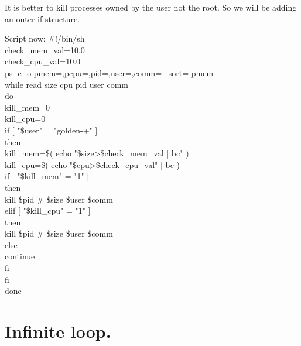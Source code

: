\documentclass[12pt,a4paper]{article}
\begin{document}
It is better to kill processes owned by the user not the root. So we will be adding an outer if structure.\\
\begin{flushleft}
Script now:
\newline
\#!/bin/sh\\
check\_mem\_val=10.0\\
check\_cpu\_val=10.0\\
ps -e -o pmem=,pcpu=,pid=,user=,comm= --sort=-pmem |\\
  while read size cpu pid user comm\\
  do\\
kill\_mem=0\\
kill\_cpu=0\\
if [ "\$user" = "golden-+" ]\\
    then\\
kill\_mem=\$( echo "\$size>\$check\_mem\_val | bc" )\\
kill\_cpu=\$( echo "\$cpu>\$check\_cpu\_val" | bc )\\
 if [ "\$kill\_mem" = "1" ]\\
      then\\
        kill \$pid \# \$size \$user \$comm\\
      elif [ "\$kill\_cpu" = "1" ]\\
      then\\
        kill \$pid \# \$size \$user \$comm\\
      else\\
        continue\\
      fi\\
fi\\
  done\\
\end{flushleft}
\newpage
\section{Infinite loop.}
\end{document}
